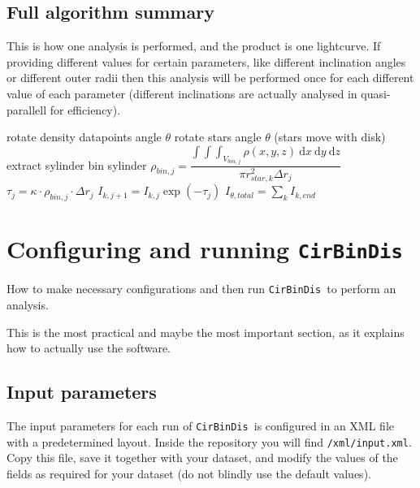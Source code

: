 \documentclass[a4paper, 12pt, english, titlepage]{article}
\newcommand{\D}[1]{\ \mathrm{d}#1} %
\newcommand{\sname}{\texttt{CirBinDis }}
\begin{document}
\subsection{Full algorithm summary}
    \label{sec:algorithm_summary}
    This is how one analysis is performed, and the product is one lightcurve. If providing different values for certain parameters, like different inclination angles or different outer radii then this analysis will be performed once for each different value of each parameter (different inclinations are actually analysed in quasi-parallell for efficiency).
    \begin{algorithmic}
            \STATE rotate density datapoints angle $\theta$
            \STATE rotate stars angle $\theta$ (stars move with disk)
                \STATE extract sylinder
                \STATE bin sylinder
                    \STATE $\rho_{bin,j} =
                        \dfrac{\int\int\int_{V_{bin,j}} \rho(x,y,z) \D{x}\D{y}\D{z}}
                        {\pi r_{star,k}^2 \Delta r_j}$
                    \STATE $\tau_j = \kappa \cdot \rho_{bin,j} \cdot \Delta r_j$
                    \STATE $I_{k,j+1} = I_{k,j} \exp(-\tau_j)$
                \ENDFOR
            \ENDFOR
            \STATE $I_{\theta,total} = \sum_k I_{k,end}$
        \ENDFOR
    \end{algorithmic}




\section{Configuring and running \sname}

How to make necessary configurations and then run \sname to perform an analysis.

This is the most practical and maybe the most important section, as it explains how to actually use the software.

\subsection{Input parameters}
    The input parameters for each run of \sname is configured in an XML file with a predetermined layout.
    Inside the repository you will find \texttt{/xml/input.xml}. Copy this file, save it together with your dataset, and modify the values of the fields as required for your dataset (do not blindly use the default values).
\end{document}
